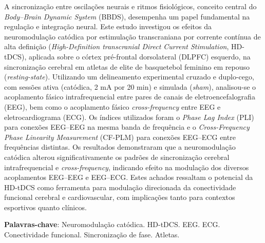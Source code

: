 
\setlength{\absparsep}{18pt} %
\begin{resumo}
A sincronização entre oscilações neurais e ritmos fisiológicos, conceito central do \textit{Body--Brain Dynamic System} (BBDS), desempenha um papel fundamental na regulação e integração neural. Este estudo investigou os efeitos da neuromodulação catódica por estimulação transcraniana por corrente contínua de alta definição (\textit{High-Definition transcranial Direct Current Stimulation}, HD-tDCS), aplicada sobre o córtex pré-frontal dorsolateral (DLPFC) esquerdo, na sincronização cerebral em atletas de elite de basquetebol feminino em repouso (\textit{resting-state}). Utilizando um delineamento experimental cruzado e duplo-cego, com sessões ativa (catódica, 2 mA por 20 min) e simulada (\textit{sham}), analisou-se o acoplamento fásico intrafrequencial entre pares de canais de eletroencefalografia (EEG), bem como o acoplamento fásico \textit{cross-frequency} entre EEG e eletrocardiograma (ECG). Os índices utilizados foram o \textit{Phase Lag Index} (PLI) para conexões EEG--EEG na mesma banda de frequência e o \textit{Cross-Frequency Phase Linearity Measurement} (CF-PLM) para conexões EEG--ECG entre frequências distintas. Os resultados demonstraram que a neuromodulação catódica alterou significativamente os padrões de sincronização cerebral intrafrequencial e \textit{cross-frequency}, indicando efeito na modulação dos diversos acoplamentos EEG--EEG e EEG--ECG. Estes achados ressaltam o potencial da HD-tDCS como ferramenta para modulação direcionada da conectividade funcional cerebral e cardiovascular, com implicações tanto para contextos esportivos quanto clínicos.

\textbf{Palavras-chave}: Neuromodulação catódica. HD-tDCS. EEG. ECG. Conectividade funcional. Sincronização de fase. Atletas.

\end{resumo}


